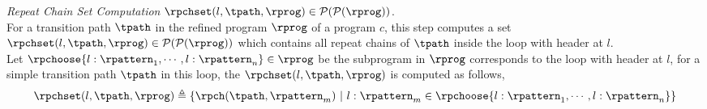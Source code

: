 \begin{enumerate}
\emph{Repeat Chain Set Computation}
$\rpchset(l, \tpath, \rprog) \in \mathcal{P}(\mathcal{P}(\rprog))$.
\\
For a transition path $\tpath$ in the refined program $\rprog$ of a program $c$, 
this step computes a set 
$\rpchset(l, \tpath, \rprog) \in \mathcal{P}(\mathcal{P}(\rprog))$
which contains
 all repeat chains of $\tpath$ inside the loop with header at $l$.
 \\
Let $\rpchoose{l: \rpattern_1, \cdots, l: \rpattern_n}  \in \rprog$
be the subprogram in $\rprog$ corresponds to the  loop with header at $l$, for a simple transition path $\tpath$ in this loop,
the $\rpchset(l, \tpath, \rprog)$ is computed as follows,
 \[
    \rpchset(l, \tpath, \rprog) \triangleq \left\{\rpch(\tpath, \rpattern_m)
    ~\middle\vert~
    l : \rpattern_m \in \rpchoose{l: \rpattern_1, \cdots, l: \rpattern_n} 
    \right\}
 \]
%
  

\end{enumerate}
